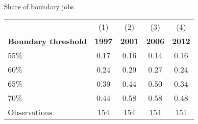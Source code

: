 \begin{center}
\begin{threeparttable}[!h]
\caption{Share of boundary jobs}
\begin{tabular}{lcccc}
\toprule
\toprule
&\multicolumn{1}{c}{(1)}&\multicolumn{1}{c}{(2)}&\multicolumn{1}{c}{(3)}&\multicolumn{1}{c}{(4)} \\
\textbf{Boundary threshold}&\multicolumn{1}{c}{\textbf{1997}}&\multicolumn{1}{c}{\textbf{2001}}&\multicolumn{1}{c}{\textbf{2006}}&\multicolumn{1}{c}{\textbf{2012}} \\
\midrule
55\%            &        0.17&        0.16&        0.14&        0.16\\
60\%           &        0.24&        0.29&        0.27&        0.24\\
65\%            &        0.39&        0.44&        0.50&        0.34\\
70\%            &        0.44&        0.58&        0.58&        0.48\\
\midrule
Observations                   &         154&         154&         154&         151\\
\bottomrule
\bottomrule
\end{tabular}
\end{threeparttable}
\end{center}